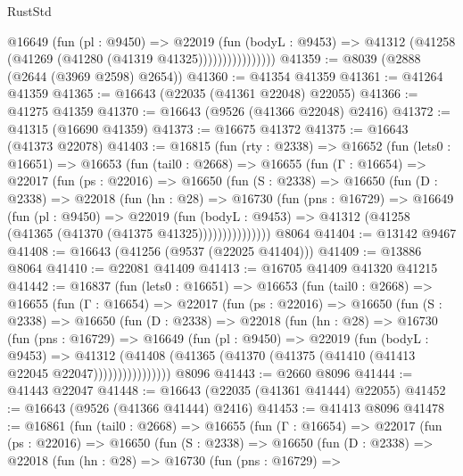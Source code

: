 \begin{lexlean}{RustStd}
\begin{coremodule}
                      @16649
                        (fun (pl : @9450) =>
                        @22019
                          (fun (bodyL : @9453) =>
                          @41312 (@41258 (@41269 (@41280 (@41319 @41325))))))))))))))))
@41359 := @8039 (@2888 (@2644 (@3969 @2598) @2654))
@41360 := @41354 @41359
@41361 := @41264 @41359
@41365 := @16643 (@22035 (@41361 @22048) @22055)
@41366 := @41275 @41359
@41370 := @16643 (@9526 (@41366 @22048) @2416)
@41372 := @41315 (@16690 @41359)
@41373 := @16675 @41372
@41375 := @16643 (@41373 @22078)
@41403 := @16815
    (fun (rty : @2338) =>
    @16652
      (fun (lets0 : @16651) =>
      @16653
        (fun (tail0 : @2668) =>
        @16655
          (fun (Γ : @16654) =>
          @22017
            (fun (ps : @22016) =>
            @16650
              (fun (S : @2338) =>
              @16650
                (fun (D : @2338) =>
                @22018
                  (fun (hn : @28) =>
                  @16730
                    (fun (pns : @16729) =>
                    @16649
                      (fun (pl : @9450) =>
                      @22019
                        (fun (bodyL : @9453) =>
                        @41312 (@41258 (@41365 (@41370 (@41375 @41325)))))))))))))))
    @8064
@41404 := @13142 @9467
@41408 := @16643 (@41256 (@9537 (@22025 @41404)))
@41409 := @13886 @8064
@41410 := @22081 @41409
@41413 := @16705 @41409 @41320 @41215
@41442 := @16837
    (fun (lets0 : @16651) =>
    @16653
      (fun (tail0 : @2668) =>
      @16655
        (fun (Γ : @16654) =>
        @22017
          (fun (ps : @22016) =>
          @16650
            (fun (S : @2338) =>
            @16650
              (fun (D : @2338) =>
              @22018
                (fun (hn : @28) =>
                @16730
                  (fun (pns : @16729) =>
                  @16649
                    (fun (pl : @9450) =>
                    @22019
                      (fun (bodyL : @9453) =>
                      @41312
                        (@41408
                          (@41365 (@41370 (@41375 (@41410 (@41413 @22045 @22047))))))))))))))))
    @8096
@41443 := @2660 @8096
@41444 := @41443 @22047
@41448 := @16643 (@22035 (@41361 @41444) @22055)
@41452 := @16643 (@9526 (@41366 @41444) @2416)
@41453 := @41413 @8096
@41478 := @16861
    (fun (tail0 : @2668) =>
    @16655
      (fun (Γ : @16654) =>
      @22017
        (fun (ps : @22016) =>
        @16650
          (fun (S : @2338) =>
          @16650
            (fun (D : @2338) =>
            @22018
              (fun (hn : @28) =>
              @16730
                (fun (pns : @16729) =>

\end{coremodule}
\end{lexlean}
